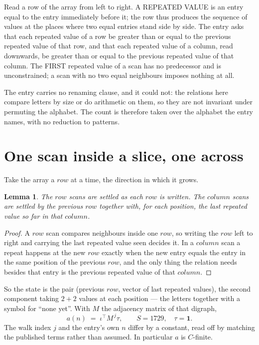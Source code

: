\documentclass[11pt,a4paper]{article}
\theoremstyle{plain}
\newtheorem{lemma}[theorem]{Lemma}
\theoremstyle{definition}
\begin{document}
Read a row of the array from left to right. A REPEATED VALUE is an entry equal to the entry
immediately before it; the row thus produces the sequence of values at the places where two
equal entries stand side by side. The entry asks that each repeated value of a row be
greater than or equal to the previous repeated value of that row, and that each repeated value of a column,
read downwards, be greater than or equal to the previous repeated value of that column. The FIRST repeated
value of a scan has no predecessor and is unconstrained; a scan with no two equal neighbours
imposes nothing at all.

The entry carries no renaming clause, and it could not: the relations here compare letters by
size or do arithmetic on them, so they are not invariant under permuting the alphabet. The
count is therefore taken over the alphabet the entry names, with no reduction to patterns.

\section{One scan inside a slice, one across}

Take the array a $row$ at a time, the direction in which it grows.

\begin{lemma}\label{lem:state}
The $row$ scans are settled as each $row$ is written. The $column$ scans are
settled by the previous $row$ together with, for each position, the last repeated value
so far in that $column$.
\end{lemma}

\begin{proof}
A $row$ scan compares neighbours inside one $row$, so writing the
$row$ left to right and carrying the last repeated value seen decides it. In a
$column$ scan a repeat happens at the new $row$ exactly when the new entry equals the
entry in the same position of the previous $row$, and the only thing the relation needs
besides that entry is the previous repeated value of that $column$.
\end{proof}

So the state is the pair (previous $row$, vector of last repeated values), the second
component taking $2+2$ values at each position --- the letters together with a symbol for
``none yet''. With $M$ the adjacency matrix of that digraph,
\[
a(n)\;=\;\iota^{\!\top}M^{\,j}\tau ,\qquad S=1729,\quad\tau=\mathbf{1} .
\]
The walk index $j$ and the entry's own $n$ differ by a constant, read off by matching the
published terms rather than assumed. In particular $a$ is $C$-finite.
\end{document}
